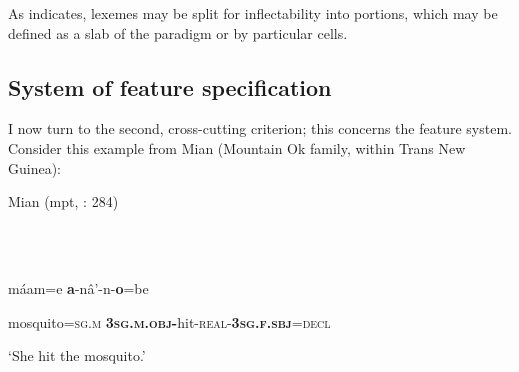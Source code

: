 \documentclass[output=paper]{langscibook}
\begin{document}
As  indicates, lexemes may be split for inflectability into portions, which may be defined as a slab of the paradigm or by particular cells. 

\subsection{\textbf{System} \textbf{of} \textbf{feature} \textbf{specification}}

I now turn to the second, cross-cutting criterion; this concerns the feature system. Consider this example from Mian (Mountain Ok family, within Trans New Guinea):

Mian (mpt, \citealt{Fedden2022}: 284)

\ea%
    \label{ex:key:9}
    \gll \\
         \\
    \glt
    \z %

          máam=e  \textbf{a}{}-nâ’-n-\textbf{o}=be  

  mosquito=\textsc{sg.m}  \textbf{\textsc{3sg.m.obj}}\textbf{{}-}hit-\textsc{real-}\textbf{\textsc{3sg.f.sbj}}\textsc{=decl}

  ‘She hit the mosquito.’
\end{document}
